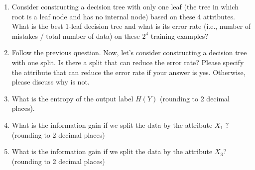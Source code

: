 \documentclass[11pt]{article}
\begin{document}
\begin{enumerate}
\item {} Consider constructing a decision tree with only one leaf (the tree in which root is a leaf node and has no internal node) based on these 4 attributes. What is the best $1$-leaf decision tree and what is its error rate (i.e., number of mistakes / total number of data) on these $2^4$ training examples? 


\item {} Follow the previous question. Now, let's consider constructing a decision tree with one split. Is there a split that can reduce the error rate? Please specify the attribute that can reduce the error rate if your answer is yes. Otherwise, please discuss why is not. 


\item {} What is the entropy of the output label $H(Y)$ (rounding to 2 decimal places).


\item {} What is the information gain if we split the data by the attribute $X_1$ ? (rounding to 2 decimal places)


\item {} What is the information gain if we split the data by the attribute $X_3$? (rounding to 2 decimal places)


\end{enumerate}

\pagebreak

\ifsoln 
\else
\clearpage
\fi


\pagebreak


\end{document}
